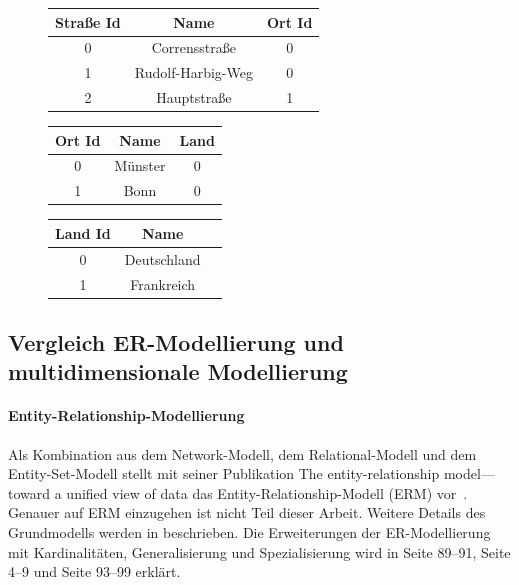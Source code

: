\documentclass[
  language=german, %
  type=bachelor%
]{isthesis}
\begin{document}
\begin{content}
  \begin{figure}[caption={Beispiel der Dimensionstabellen \textit{Ort} im Snowflake-Schema}, label={table:dimension-table-snow}]
    \footnotesize
    \begin{tabular}{c c c }
      Straße Id & Name & Ort Id \\
      \toprule
      0 & Corrensstraße & 0 \\
      1 & Rudolf-Harbig-Weg & 0 \\
      2 & Hauptstraße & 1 \\
    \end{tabular}
    \begin{tabular}{c c c}
      Ort Id & Name & Land \\
      \toprule
      0 & Münster & 0 \\
      1 & Bonn & 0 \\
    \end{tabular}
    \begin{tabular}{c c c }
      Land Id & Name \\
      \toprule
      0 & Deutschland \\
      1 & Frankreich \\
    \end{tabular}
  \end{figure}

  \subsection{Vergleich \acrshort{ER}-Modellierung und multidimensionale Modellierung}

  \paragraph{Entity-Relationship-Modellierung} Als Kombination aus dem
  Network-Modell, dem Relational-Modell und dem Entity-Set-Modell stellt
  \textsc{\citeauthor{chen1976entity}} \citeyear{chen1976entity} mit seiner Publikation
  \glqq{}The entity-relationship model—toward a unified view of data\grqq{} das
  Entity-Relationship-Modell (\acrshort{ERM}) vor~\cite[][S. 2]{chen1976entity}.  Genauer
  auf \acrshort{ERM} einzugehen ist nicht Teil dieser Arbeit. Weitere Details
  des Grundmodells werden in \textsc{\cite{chen1976entity}} beschrieben. Die
  Erweiterungen der ER-Modellierung mit Kardinalitäten, Generalisierung und
  Spezialisierung wird in \textsc{\cite{becker2004handelsinformationssysteme}}
  Seite 89--91, \textsc{\cite{becker2012grundsatze}} Seite 4--9 und
  \textsc{\cite{schutte2013grundsatze}} Seite 93--99 erklärt.


\end{content}
\end{document}
